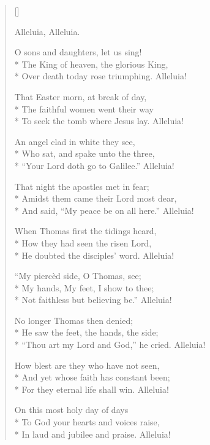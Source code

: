 \newHymn
{}

\begin{verse}[\versewidth]

 Alleluia, Alleluia.

O sons and daughters, let us sing!\\*
The King of heaven, the glorious King,\\*
Over death today rose triumphing. Alleluia!
\pointorig

That Easter morn, at break of day,\\*
The faithful women went their way\\*
To seek the tomb where Jesus lay. Alleluia!

An angel clad in white they see,\\*
Who sat, and spake unto the three,\\*
``Your Lord doth go to Galilee.''
Alleluia!

That night the apostles met in fear;\\*
Amidst them came their Lord most dear,\\*
And said, ``My peace be on all here.''
Alleluia!

When Thomas first the tidings heard,\\*
How they had seen the risen Lord,\\*
He doubted the disciples' word.
Alleluia!

``My piercèd side, O Thomas, see;\\*
My hands, My feet, I show to thee;\\*
Not faithless but believing be.''
Alleluia!

No longer Thomas then denied;\\*
He saw the feet, the hands, the side;\\*
``Thou art my Lord and God,'' he cried.
Alleluia!

How blest are they who have not seen,\\*
And yet whose faith has constant been;\\*
For they eternal life shall win.
Alleluia!

On this most holy day of days\\*
To God your hearts and voices raise,\\*
In laud and jubilee and praise.
Alleluia!


\end{verse}

